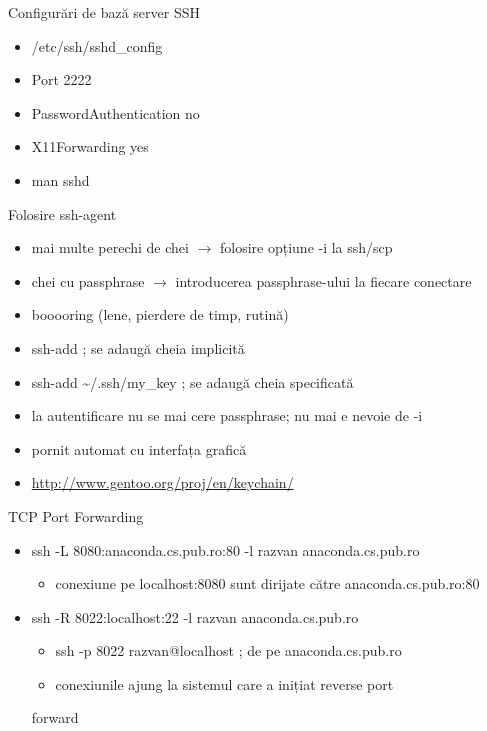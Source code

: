 \documentclass{beamer}
\begin{document}
\begin{frame}{Configurări de bază server SSH}
  \begin{itemize}
    \item /etc/ssh/sshd\_config
    \item Port 2222
    \item PasswordAuthentication no
    \item X11Forwarding yes
    \item man sshd
  \end{itemize}
\end{frame}

\begin{frame}{Folosire ssh-agent}
  \begin{itemize}
    \item mai multe perechi de chei $\rightarrow$ folosire opțiune -i la ssh/scp
    \item chei cu passphrase $\rightarrow$ introducerea passphrase-ului la fiecare conectare
    \item booooring (lene, pierdere de timp, rutină)
    \item ssh-add    ; se adaugă cheia implicită
    \item ssh-add \~{}/.ssh/my\_key    ; se adaugă cheia specificată
    \item la autentificare nu se mai cere passphrase; nu mai e nevoie de -i
    \item pornit automat cu interfața grafică
    \item \url{http://www.gentoo.org/proj/en/keychain/}
  \end{itemize}
\end{frame}

\begin{frame}{TCP Port Forwarding}
  \begin{itemize}
    \item ssh -L 8080:anaconda.cs.pub.ro:80 -l razvan anaconda.cs.pub.ro
      \begin{itemize}
        \item conexiune pe localhost:8080 sunt dirijate către
anaconda.cs.pub.ro:80
      \end{itemize}
    \item ssh -R 8022:localhost:22 -l razvan anaconda.cs.pub.ro
       \begin{itemize}
         \item ssh -p 8022 razvan@localhost ; de pe anaconda.cs.pub.ro
         \item conexiunile ajung la sistemul care a inițiat reverse port
       \end{itemize}
forward
  \end{itemize}
\end{frame}
\end{document}

